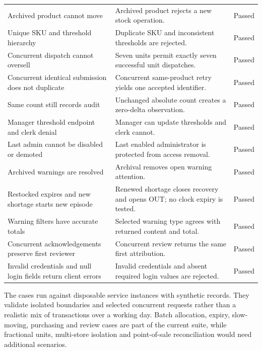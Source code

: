 \begin{longtable}{>{\raggedright\arraybackslash}p{}>{\raggedright\arraybackslash}p{}>{\raggedright\arraybackslash}p{}}
\leavevmode{}Archived product cannot move & \leavevmode{}Archived product rejects a new stock operation. & \leavevmode{}Passed \\
\leavevmode{}Unique SKU and threshold hierarchy & \leavevmode{}Duplicate SKU and inconsistent thresholds are rejected. & \leavevmode{}Passed \\
\leavevmode{}Concurrent dispatch cannot oversell & \leavevmode{}Seven units permit exactly seven successful unit dispatches. & \leavevmode{}Passed \\
\leavevmode{}Concurrent identical submission does not duplicate & \leavevmode{}Concurrent same-product retry yields one accepted identifier. & \leavevmode{}Passed \\
\leavevmode{}Same count still records audit & \leavevmode{}Unchanged absolute count creates a zero-delta observation. & \leavevmode{}Passed \\
\leavevmode{}Manager threshold endpoint and clerk denial & \leavevmode{}Manager can update thresholds and clerk cannot. & \leavevmode{}Passed \\
\leavevmode{}Last admin cannot be disabled or demoted & \leavevmode{}Last enabled administrator is protected from access removal. & \leavevmode{}Passed \\
\leavevmode{}Archived warnings are resolved & \leavevmode{}Archival removes open warning attention. & \leavevmode{}Passed \\
\leavevmode{}Restocked expires and new shortage starts new episode & \leavevmode{}Renewed shortage closes recovery and opens OUT; no clock expiry is tested. & \leavevmode{}Passed \\
\leavevmode{}Warning filters have accurate totals & \leavevmode{}Selected warning type agrees with returned content and total. & \leavevmode{}Passed \\
\leavevmode{}Concurrent acknowledgements preserve first reviewer & \leavevmode{}Concurrent review returns the same first attribution. & \leavevmode{}Passed \\
\leavevmode{}Invalid credentials and null login fields return client errors & \leavevmode{}Invalid credentials and absent required login values are rejected. & \leavevmode{}Passed \\
\end{longtable}\endgroup

The cases run against disposable service instances with synthetic records. They validate isolated boundaries and selected concurrent requests rather than a realistic mix of transactions over a working day. Batch allocation, expiry, slow-moving, purchasing and review cases are part of the current suite, while fractional units, multi-store isolation and point-of-sale reconciliation would need additional scenarios.


